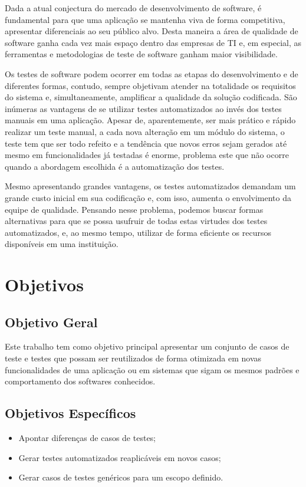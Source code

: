 \documentclass[12pt]{article}
\begin{document}
	Dada a atual conjectura do mercado de desenvolvimento de software, é fundamental para
	que uma aplicação se mantenha viva de forma competitiva, apresentar diferenciais ao seu público alvo. Desta
	maneira a área de qualidade de software ganha cada vez mais espaço dentro das empresas de TI e, em especial, as ferramentas e
	metodologias de teste de software ganham maior visibilidade.
	
	Os testes de software podem ocorrer em todas as etapas do desenvolvimento e de diferentes formas, contudo,
	sempre objetivam atender na totalidade os requisitos do sistema e, simultaneamente, amplificar a qualidade da solução
	codificada. São inúmeras as vantagens de se utilizar testes automatizados ao invés dos testes manuais em uma aplicação.
	Apesar de, aparentemente, ser mais prático e rápido realizar um teste manual, a cada nova alteração em um módulo do sistema,
	o teste tem que ser todo refeito e a tendência que novos erros sejam gerados até mesmo em funcionalidades já testadas é enorme,
	problema este que não ocorre quando a abordagem escolhida é a automatização dos testes.
	
	Mesmo apresentando grandes vantagens, os testes automatizados demandam um grande custo inicial em sua codificação e, com isso, aumenta o 
	envolvimento da equipe de qualidade. Pensando nesse problema, podemos buscar formas alternativas para
	que se possa usufruir de todas estas virtudes dos testes automatizados, e, ao mesmo tempo, utilizar de forma eficiente os
	recursos disponíveis em uma instituição.
	
	\section{Objetivos}
	
	\subsection{Objetivo Geral}
	
	Este trabalho tem como objetivo principal apresentar um conjunto de casos de teste e testes que possam ser reutilizados de
	forma otimizada em novas funcionalidades de uma aplicação ou em sistemas que sigam os mesmos padrões e comportamento dos
	softwares conhecidos.
	
	\subsection{Objetivos Específicos}
	\begin{itemize}
		\item Apontar diferenças de casos de testes;
		\item Gerar testes automatizados reaplicáveis em novos casos;
		\item Gerar casos de testes genéricos para um escopo definido.
	\end{itemize}
	
\end{document}
